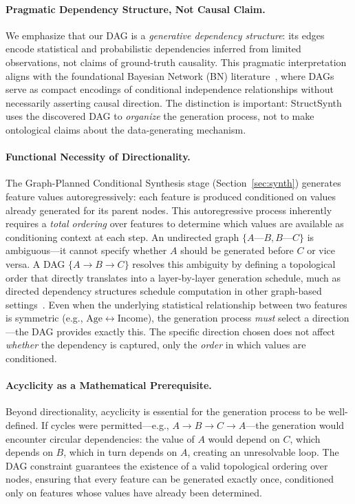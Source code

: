 \paragraph{Pragmatic Dependency Structure, Not Causal Claim.}
We emphasize that our DAG is a \emph{generative dependency structure}: its edges encode statistical and probabilistic dependencies inferred from limited observations, not claims of ground-truth causality. This pragmatic interpretation aligns with the foundational Bayesian Network (BN) literature~\cite{pearl2009causality, koller2009probabilistic}, where DAGs serve as compact encodings of conditional independence relationships without necessarily asserting causal direction. The distinction is important: StructSynth uses the discovered DAG to \emph{organize} the generation process, not to make ontological claims about the data-generating mechanism.

\paragraph{Functional Necessity of Directionality.}
The Graph-Planned Conditional Synthesis stage (Section~\ref{sec:synth}) generates feature values autoregressively: each feature is produced conditioned on values already generated for its parent nodes. This autoregressive process inherently requires a \emph{total ordering} over features to determine which values are available as conditioning context at each step. An undirected graph $\{A\text{---}B, B\text{---}C\}$ is ambiguous---it cannot specify whether $A$ should be generated before $C$ or vice versa. A DAG $\{A \to B \to C\}$ resolves this ambiguity by defining a topological order that directly translates into a layer-by-layer generation schedule, much as directed dependency structures schedule computation in other graph-based settings~\cite{du2026graphoracle}. Even when the underlying statistical relationship between two features is symmetric (e.g., $\mathrm{Age} \leftrightarrow \mathrm{Income}$), the generation process \emph{must} select a direction---the DAG provides exactly this. The specific direction chosen does not affect \emph{whether} the dependency is captured, only the \emph{order} in which values are conditioned.

\paragraph{Acyclicity as a Mathematical Prerequisite.}
Beyond directionality, acyclicity is essential for the generation process to be well-defined. If cycles were permitted---e.g., $A \to B \to C \to A$---the generation would encounter circular dependencies: the value of $A$ would depend on $C$, which depends on $B$, which in turn depends on $A$, creating an unresolvable loop. The DAG constraint guarantees the existence of a valid topological ordering over nodes, ensuring that every feature can be generated exactly once, conditioned only on features whose values have already been determined.

